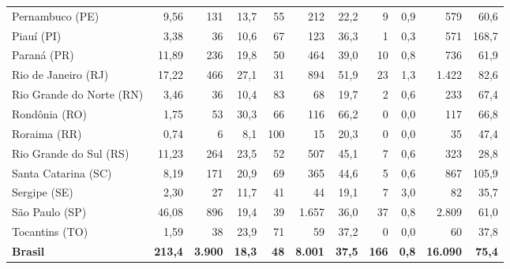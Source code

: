 \documentclass[11pt,a4paper]{article}
\begin{document}
\begin{landscape}
\begin{table}[htbp]
\begin{tabular}{l r r r r r r r r r r}
Pernambuco (PE) & 9,56 & 131 & 13,7 & 55 & 212 & 22,2 & 9 & 0,9 & 579 & 60,6 \\
Piauí (PI) & 3,38 & 36 & 10,6 & 67 & 123 & 36,3 & 1 & 0,3 & 571 & 168,7 \\
Paraná (PR) & 11,89 & 236 & 19,8 & 50 & 464 & 39,0 & 10 & 0,8 & 736 & 61,9 \\
Rio de Janeiro (RJ) & 17,22 & 466 & 27,1 & 31 & 894 & 51,9 & 23 & 1,3 & 1.422 & 82,6 \\
Rio Grande do Norte (RN) & 3,46 & 36 & 10,4 & 83 & 68 & 19,7 & 2 & 0,6 & 233 & 67,4 \\
Rondônia (RO) & 1,75 & 53 & 30,3 & 66 & 116 & 66,2 & 0 & 0,0 & 117 & 66,8 \\
Roraima (RR) & 0,74 & 6 & 8,1 & 100 & 15 & 20,3 & 0 & 0,0 & 35 & 47,4 \\
Rio Grande do Sul (RS) & 11,23 & 264 & 23,5 & 52 & 507 & 45,1 & 7 & 0,6 & 323 & 28,8 \\
Santa Catarina (SC) & 8,19 & 171 & 20,9 & 69 & 365 & 44,6 & 5 & 0,6 & 867 & 105,9 \\
Sergipe (SE) & 2,30 & 27 & 11,7 & 41 & 44 & 19,1 & 7 & 3,0 & 82 & 35,7 \\
São Paulo (SP) & 46,08 & 896 & 19,4 & 39 & 1.657 & 36,0 & 37 & 0,8 & 2.809 & 61,0 \\
Tocantins (TO) & 1,59 & 38 & 23,9 & 71 & 59 & 37,2 & 0 & 0,0 & 60 & 37,8 \\
\midrule
\textbf{Brasil} & \textbf{213,4} & \textbf{3.900} & \textbf{18,3} & \textbf{48} & \textbf{8.001} & \textbf{37,5} & \textbf{166} & \textbf{0,8} & \textbf{16.090} & \textbf{75,4} \\
\bottomrule
\end{tabular}
\end{table}
\end{landscape}
\end{document}

